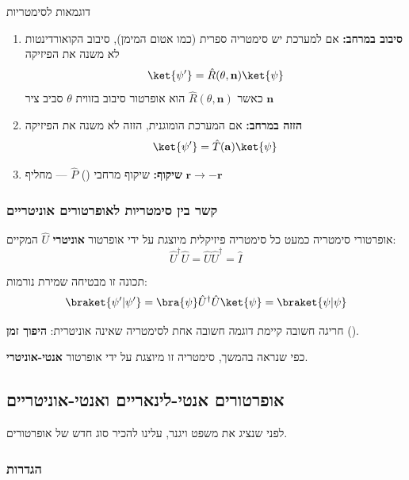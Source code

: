 \begin{examplebox}{דוגמאות לסימטריות}
\begin{enumerate}
    \item \textbf{סיבוב במרחב:} אם למערכת יש סימטריה ספרית (כמו אטום המימן), סיבוב הקואורדינטות לא משנה את הפיזיקה
    \[
    \ket{\psi'} = \hat{R}(\theta, \mathbf{n})\ket{\psi}
    \]
    כאשר $\hat{R}(\theta, \mathbf{n})$ הוא אופרטור סיבוב בזווית $\theta$ סביב ציר $\mathbf{n}$
    
    \item \textbf{הזזה במרחב:} אם המערכת הומוגנית, הזזה לא משנה את הפיזיקה
    \[
    \ket{\psi'} = \hat{T}(\mathbf{a})\ket{\psi}
    \]
    
    \item \textbf{שיקוף:} שיקוף מרחבי () $\hat{P}$ — מחליף $\mathbf{r} \to -\mathbf{r}$
\end{enumerate}
\end{examplebox}

\subsubsection*{קשר בין סימטריות לאופרטורים אוניטריים}

\begin{theorembox}{אופרטורי סימטריה}
כמעט כל סימטריה פיזיקלית מיוצגת על ידי אופרטור \textbf{אוניטרי} $\hat{U}$ המקיים:
\[
\hat{U}^\dagger \hat{U} = \hat{U} \hat{U}^\dagger = \hat{I}
\]

תכונה זו מבטיחה שמירת נורמות:
\[
\braket{\psi'|\psi'} = \bra{\psi}\hat{U}^\dagger\hat{U}\ket{\psi} = \braket{\psi|\psi}
\]
\end{theorembox}

\begin{notebox}{חריגה חשובה}
קיימת דוגמה חשובה אחת לסימטריה שאינה אוניטרית: \textbf{היפוך זמן} (). 

כפי שנראה בהמשך, סימטריה זו מיוצגת על ידי אופרטור \textbf{אנטי-אוניטרי}.
\end{notebox}

\subsection{אופרטורים אנטי-לינאריים ואנטי-אוניטריים}

לפני שנציג את משפט ויגנר, עלינו להכיר סוג חדש של אופרטורים.

\subsubsection*{הגדרות}

